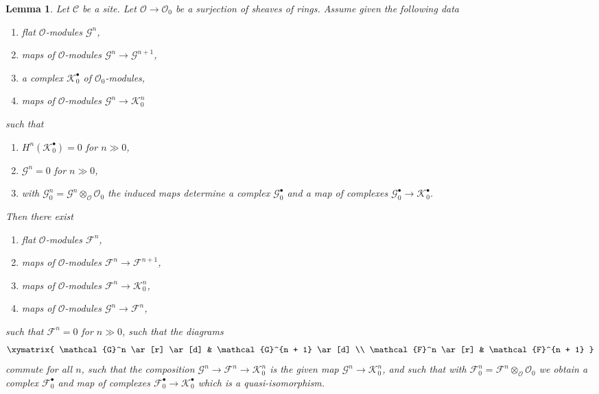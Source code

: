 \documentclass{amsart}
\theoremstyle{plain}
\newtheorem{lemma}[subsection]{Lemma}
\theoremstyle{definition}
\theoremstyle{remark}
\numberwithin{equation}{subsection}
\begin{document}
\begin{lemma}
\label{lemma-lift-complex}
Let $\mathcal{C}$ be a site. Let $\mathcal{O} \to \mathcal{O}_0$
be a surjection of sheaves of rings. Assume given the following data
\begin{enumerate}
\item flat $\mathcal{O}$-modules $\mathcal{G}^n$,
\item maps of $\mathcal{O}$-modules $\mathcal{G}^n \to \mathcal{G}^{n + 1}$,
\item a complex $\mathcal{K}_0^\bullet$ of $\mathcal{O}_0$-modules,
\item maps of $\mathcal{O}$-modules $\mathcal{G}^n \to \mathcal{K}_0^n$
\end{enumerate}
such that
\begin{enumerate}
\item[(a)] $H^n(\mathcal{K}_0^\bullet) = 0$ for $n \gg 0$,
\item[(b)] $\mathcal{G}^n = 0$ for $n \gg 0$,
\item[(c)] with
$\mathcal{G}^n_0 = \mathcal{G}^n \otimes_\mathcal{O} \mathcal{O}_0$
the induced maps determine a complex $\mathcal{G}_0^\bullet$ and a map
of complexes $\mathcal{G}_0^\bullet \to \mathcal{K}_0^\bullet$.
\end{enumerate}
Then there exist
\begin{enumerate}
\item[(\romannumeral1)]
flat $\mathcal{O}$-modules $\mathcal{F}^n$,
\item[(\romannumeral2)]
maps of $\mathcal{O}$-modules $\mathcal{F}^n \to \mathcal{F}^{n + 1}$,
\item[(\romannumeral3)]
maps of $\mathcal{O}$-modules $\mathcal{F}^n \to \mathcal{K}_0^n$,
\item[(\romannumeral4)]
maps of $\mathcal{O}$-modules $\mathcal{G}^n \to \mathcal{F}^n$,
\end{enumerate}
such that $\mathcal{F}^n = 0$ for $n \gg 0$, such that the diagrams
$$
\xymatrix{
\mathcal{G}^n \ar[r] \ar[d] & \mathcal{G}^{n + 1} \ar[d] \\
\mathcal{F}^n \ar[r] & \mathcal{F}^{n + 1}
}
$$
commute for all $n$, such that the composition
$\mathcal{G}^n \to \mathcal{F}^n \to \mathcal{K}_0^n$
is the given map $\mathcal{G}^n \to \mathcal{K}_0^n$, and such that with
$\mathcal{F}^n_0 = \mathcal{F}^n \otimes_\mathcal{O} \mathcal{O}_0$
we obtain a complex $\mathcal{F}_0^\bullet$ and map of complexes
$\mathcal{F}_0^\bullet \to \mathcal{K}_0^\bullet$ which is a
quasi-isomorphism.
\end{lemma}
\end{document}

